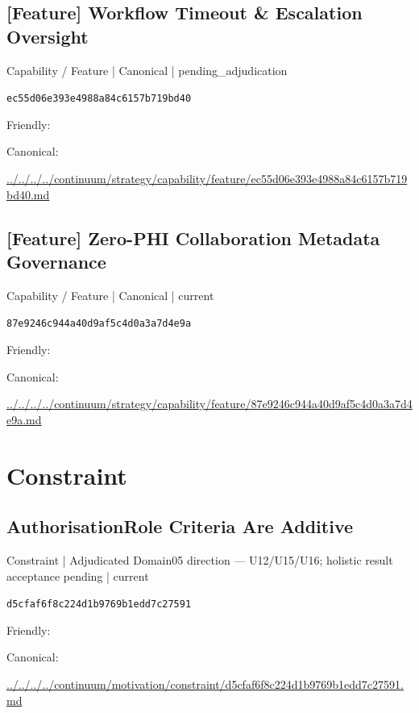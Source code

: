 \documentclass[10pt,a4paper]{article}
\begin{document}
\subsection*{[Feature] Workflow Timeout \& Escalation Oversight}
{\small Capability / Feature | Canonical | pending\_adjudication}\par
\texttt{ec55d06e393e4988a84c6157b719bd40}\par
Friendly: \par
Canonical: \par
{\footnotesize\url{../../../../continuum/strategy/capability/feature/ec55d06e393e4988a84c6157b719bd40.md}}\par
\subsection*{[Feature] Zero-PHI Collaboration Metadata Governance}
{\small Capability / Feature | Canonical | current}\par
\texttt{87e9246c944a40d9af5c4d0a3a7d4e9a}\par
Friendly: \par
Canonical: \par
{\footnotesize\url{../../../../continuum/strategy/capability/feature/87e9246c944a40d9af5c4d0a3a7d4e9a.md}}\par
\section*{Constraint}
\subsection*{AuthorisationRole Criteria Are Additive}
{\small Constraint | Adjudicated Domain05 direction — U12/U15/U16; holistic result acceptance pending | current}\par
\texttt{d5cfaf6f8c224d1b9769b1edd7c27591}\par
Friendly: \par
Canonical: \par
{\footnotesize\url{../../../../continuum/motivation/constraint/d5cfaf6f8c224d1b9769b1edd7c27591.md}}\par
\end{document}

